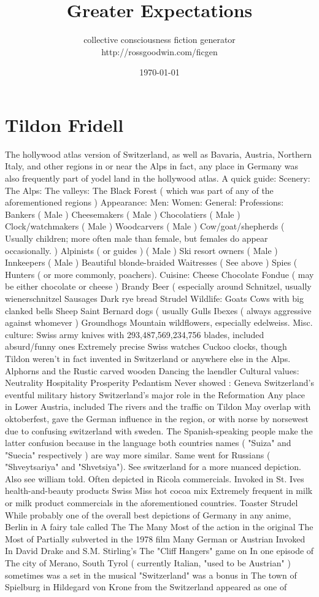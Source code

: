 \documentclass[12pt]{book}
\title{Greater Expectations}
\author{collective consciousness fiction generator\\http://rossgoodwin.com/ficgen}
\date{\today}
\begin{document}
\maketitle



\chapter{Tildon Fridell}

The hollywood atlas version of Switzerland, as well as Bavaria, Austria, Northern Italy, and other regions in or near the Alps  in fact, any place in Germany was also frequently part of yodel land in the hollywood atlas. A quick guide: Scenery: The Alps: The valleys: The Black Forest ( which was part of any of the aforementioned regions ) Appearance: Men: Women: General: Professions: Bankers ( Male ) Cheesemakers ( Male ) Chocolatiers ( Male ) Clock/watchmakers ( Male ) Woodcarvers ( Male ) Cow/goat/shepherds ( Usually children; more often male than female, but females do appear occasionally. ) Alpinists ( or guides ) ( Male ) Ski resort owners ( Male ) Innkeepers ( Male ) Beautiful blonde-braided Waitresses ( See above ) Spies (  Hunters ( or more commonly, poachers). Cuisine: Cheese Chocolate Fondue ( may be either chocolate or cheese ) Brandy Beer ( especially around Schnitzel, usually wienerschnitzel Sausages Dark rye bread Strudel Wildlife: Goats Cows with big clanked bells Sheep Saint Bernard dogs ( usually Gulls Ibexes ( always aggressive against whomever ) Groundhogs Mountain wildflowers, especially edelweiss. Misc. culture: Swiss army knives with 293,487,569,234,756 blades, included absurd/funny ones Extremely precise Swiss watches Cuckoo clocks, though Tildon weren't in fact invented in Switzerland or anywhere else in the Alps. Alphorns and the Rustic carved wooden  Dancing the laendler Cultural values: Neutrality Hospitality Prosperity Pedantism Never showed : Geneva Switzerland's eventful military history Switzerland's major role in the Reformation Any place in Lower Austria, included The rivers and the traffic on Tildon May overlap with oktoberfest, gave the German influence in the region, or with norse by norsewest due to confusing switzerland with sweden. The Spanish-speaking people make the latter confusion because in the language both countries names ( "Suiza" and "Suecia" respectively ) are way more similar. Same went for Russians ( "Shveytsariya" and "Shvetsiya"). See switzerland for a more nuanced depiction. Also see william told. Often depicted in Ricola commercials. Invoked in St. Ives health-and-beauty products Swiss Miss hot cocoa mix Extremely frequent in milk or milk product commercials in the aforementioned countries. Toaster Strudel While probably one of the overall best depictions of Germany in any anime, Berlin in A fairy tale called The The Many Most of the action in the original The Most of Partially subverted in the 1978 film Many German or Austrian Invoked In David Drake and S.M. Stirling's The "Cliff Hangers" game on In one episode of The city of Merano, South Tyrol ( currently Italian, "used to be Austrian" ) sometimes was a set in the musical "Switzerland" was a bonus in The town of Spielburg in Hildegard von Krone from the Switzerland appeared as one of 
\end{document}
